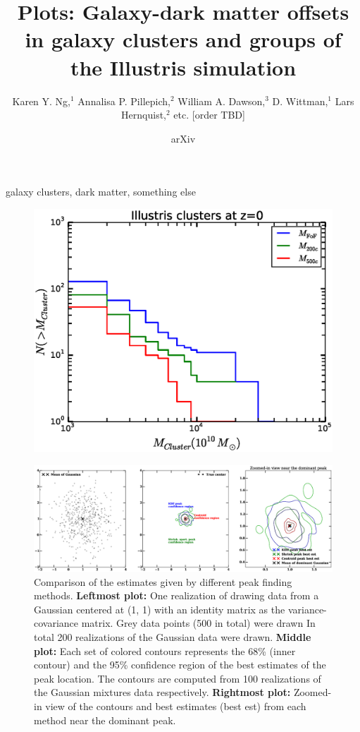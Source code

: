 \documentclass[letterpaper,useAMS,usenatbib]{mn2e}
\title[
	Galaxy-dark matter offsets in galaxy clusters and groups of the
Illustris simulation
]
{Plots: Galaxy-dark matter offsets in galaxy clusters and groups of the
Illustris simulation}
\author[Karen Y. Ng et al.]{Karen Y. Ng,$^{1}$
	Annalisa P. Pillepich,$^{2}$ 
	William A. Dawson,$^{3}$ 
	D. Wittman,$^{1}$
	\newauthor Lars Hernquist,$^{2}$
	etc. [order TBD]
}
\begin{document}
\date{arXiv} \pagerange{\pageref{firstpage}--\pageref{lastpage}}
 \maketitle\label{firstpage}
\begin{abstract} 
\end{abstract}
\begin{keywords}
	galaxy clusters, dark matter, something else 
\end{keywords}
\begin{figure}
	\includegraphics[width=.95\linewidth]{clusterMassDist.eps}
	\caption{\label{fig:config}}
\end{figure}
\begin{figure}
	\includegraphics[width=.95\linewidth]{gauss500.eps}
	\caption{Comparison of the estimates given by different peak finding methods.
		{\bf Leftmost plot:} One realization of drawing data from a Gaussian
		centered at (1, 1) with an identity matrix as the variance-covariance
		matrix. Grey data points (500 in total) were drawn 
		In total 200 realizations of the Gaussian data were drawn.
		{\bf Middle plot:} Each set of colored contours represents the
		68\% (inner contour) and the 95\% confidence region of the best estimates
		of the peak location. The contours are computed from 100 realizations of the Gaussian
		mixtures data respectively. {\bf Rightmost plot:} Zoomed-in view of the
		contours and best estimates (best est) from each method near the dominant peak.  
		\label{fig:dumbbell500}}
\end{figure}
\end{document}
